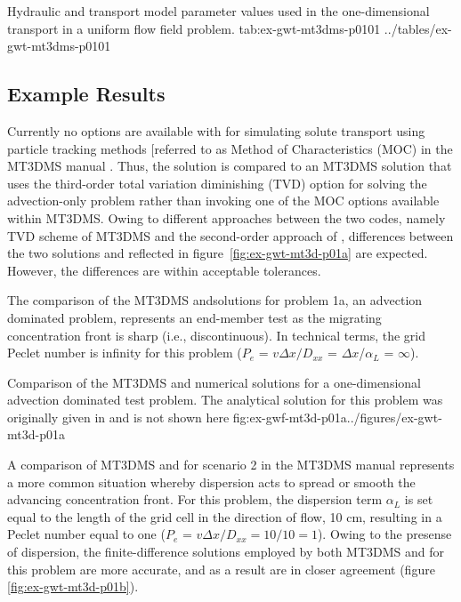 \begin{StandardTable}
	{Hydraulic and transport model parameter values used in the one-dimensional transport in a uniform flow field problem.}
	{tab:ex-gwt-mt3dms-p0101}
	{../tables/ex-gwt-mt3dms-p0101}
\end{StandardTable}

\subsection{Example Results}

Currently no options are available with \mf for simulating solute transport using particle tracking methods [referred to as Method of Characteristics (MOC) in the MT3DMS manual \cite{zheng1999mt3dms}.  Thus, the \mf solution is compared to an MT3DMS solution that uses the third-order total variation diminishing (TVD) option for solving the advection-only problem rather than invoking one of the MOC options available within MT3DMS.  Owing to different approaches between the two codes, namely TVD scheme of  MT3DMS and the second-order approach of \mf, differences between the two solutions and reflected in figure~\ref{fig:ex-gwt-mt3d-p01a} are expected.  However, the differences are within acceptable tolerances.

The comparison of the MT3DMS and\mf solutions for problem 1a, an advection dominated problem, represents an end-member test as the migrating concentration front is sharp (i.e., discontinuous). In technical terms, the grid Peclet number is infinity for this problem ($P_e$ = $v\Delta x/D_{xx}$ = $\Delta x$/$\alpha_L$ = $\infty$).

\begin{StandardFigure}
	{Comparison of the MT3DMS and \mf numerical solutions for a one-dimensional advection dominated test problem.  The analytical solution for this problem was originally given in \cite{vanGenuchtenAlves1982} and is not shown here}
	{fig:ex-gwf-mt3d-p01a}{../figures/ex-gwt-mt3d-p01a}
\end{StandardFigure}

A comparison of MT3DMS and \mf for scenario 2 in the MT3DMS manual represents a more common situation whereby dispersion acts to spread or smooth the advancing concentration front.  For this problem, the dispersion term $\alpha_L$ is set equal to the length of the grid cell in the direction of flow, 10 cm, resulting in a Peclet number equal to one ($P_e$ = $v\Delta x/D_{xx} = 10/10 = 1$).  Owing to the presense of dispersion, the finite-difference solutions employed by both MT3DMS and \mf for this problem are more accurate, and as a result are in closer agreement (figure \ref{fig:ex-gwt-mt3d-p01b}).

